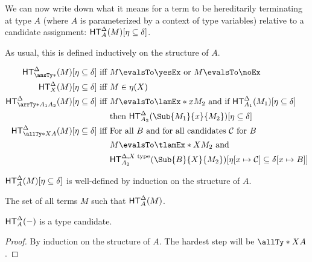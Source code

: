 \documentclass[letterpaper]{article}
\begin{document}
We can now write down what it means for a term to be hereditarily terminating at type $A$ (where $A$ is parameterized by a context of type variables) relative to a candidate assignment: $\HT^{\Delta}(M)[\eta \subseteq \delta]$. 

As usual, this is defined inductively on the structure of $A$.

\begin{align*}
\HT[\ansTy*]^{\Delta}(M)[\eta \subseteq \delta]  \text{ iff }&  M \evalsTo \yesEx \text{ or } M \evalsTo \noEx \\
\HT[X]^{\Delta}(M)[\eta \subseteq \delta]  \text{ iff }&  M \in \eta(X) \\
\HT[\arrTy*{A_1}{A_2}]^{\Delta}(M)[\eta \subseteq \delta]  \text{ iff }&  M \evalsTo \lamEx*{x}{M_2} \text{ and if } \HT[A_1]^{\Delta}(M_1)[\eta \subseteq \delta]\\   & \text{then } \HT[A_2]^{\Delta}(\Sub{M_1}{x}{M_2})[\eta \subseteq \delta] \\
\HT[\allTy*{X}{A}]^{\Delta}(M)[\eta \subseteq \delta]  \text{ iff }&  \text{For all } B \text{ and for all candidates } \mathcal{C} \text{ for } B \\ & M \evalsTo \tlamEx*{X}{M_2} \text{ and } \\ & \HT[A_2]^{\Delta, X \text{ type}}(\Sub{B}{X}{M_2})[\eta[x \mapsto \mathcal{C}] \subseteq \delta[x \mapsto B]]
\end{align*}

\begin{lemma}\label{lem:welldefined}
$\HT^{\Delta}(M)[\eta \subseteq \delta]$ is well-defined by induction on the structure of $A$.
\end{lemma}

\begin{definition}[$\HT^{\Delta}(-)$]
The set of all terms $M$ such that $\HT^{\Delta}(M)$.
\end{definition}

\begin{lemma}\label{lem:ht-candidate}
$\HT^{\Delta}(-)$ is a type candidate.
\end{lemma}
\begin{proof}
By induction on the structure of $A$. The hardest step will be $\allTy*{X}{A}$.
\end{proof}
\end{document}
